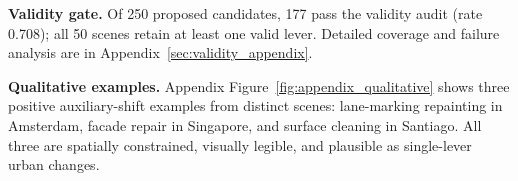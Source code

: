 \noindent\textbf{Validity gate.}
Of 250 proposed candidates, 177 pass the validity audit (rate 0.708);
all 50 scenes retain at least one valid lever. Detailed coverage and
failure analysis are in Appendix~\ref{sec:validity_appendix}.

\noindent\textbf{Qualitative examples.}
Appendix Figure~\ref{fig:appendix_qualitative} shows three positive auxiliary-shift
examples from distinct scenes: lane-marking repainting in Amsterdam,
facade repair in Singapore, and surface cleaning in
Santiago. All three are spatially constrained, visually
legible, and plausible as single-lever urban changes.

